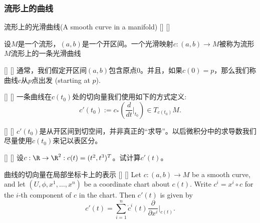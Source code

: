 \documentclass[UTF8]{ctexart}
\begin{document}
    \subsubsection{流形上的曲线}

    \begin{dfn}
        []
        {流形上的光滑曲线(A smooth curve in a manifold)}
        []
        []

        设$M$是一个流形，$(a,b)$是一个开区间。一个光滑映射$c : (a , b) \rightarrow M$被称为流形$M$流形上的一条光滑曲线
    \end{dfn}

    \begin{rmk}
        []
        {}
        []
        []
        通常，我们假定开区间$(a,b)$包含原点$0$。并且，如果$c(0) = p$，那么我们称曲线$c$从$p$点出发 (starting at $p$).
    \end{rmk}
    
    \begin{dfn}
        []
        {}
        []
        []
        一条曲线在$c(t_0)$处的切向量我们使用如下的方式定义:
    \[
        c'(t_0) := c_{*}(\frac{d}{dt}|_{t_0}) \in T_{c(t_0)}M.
    \]
    \end{dfn}

    \begin{rmk}
        []
        {}
        []
        []
        $c'(t_0)$是从开区间到切空间，并非真正的“求导”。以后微积分中的求导数我们尽量使用$\dot{c}(t_0)$来记以表区分。
    \end{rmk}

    \begin{xmp}
        []
        {}
        []
        []
        设$c : \R \rightarrow \R^2 : c(t) = (t^2 , t^3)^T$。试计算$c'(t)$。
    \end{xmp}

    \begin{ppt}
        []
        {曲线的切向量在局部坐标卡上的表示}
        []
        []
        Let \( c : (a,b) \to M \) be a smooth curve, 
        and let \( (U, \phi, x^1, \dots, x^n) \) be a coordinate chart about \( c(t) \). 
        Write \( c^i = x^i \circ c \) for the \( i \)-th component of \( c \) in the chart. Then \( c'(t) \) is given by
    \[
    c'(t) = \sum_{i=1}^{n} \dot{c}^i(t) \frac{\partial}{\partial x^i} \bigg|_{c(t)}.
    \]
    \end{ppt}
    
\end{document}
